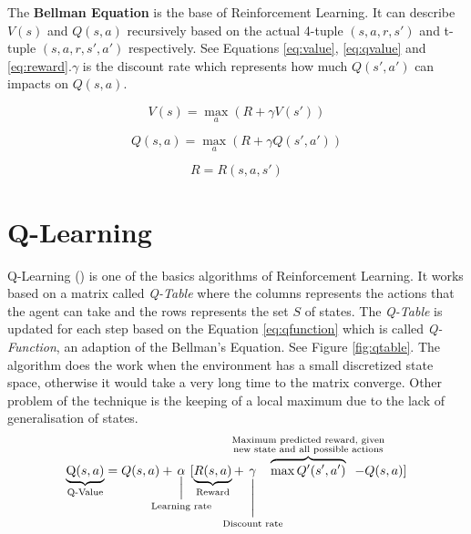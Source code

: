\begin{defn}The \textbf{Bellman Equation} is the base of Reinforcement Learning. It can describe $V(s)$ and $Q(s,a)$ recursively based on the actual 4-tuple $(s, a, r, s')$ and t-tuple $(s, a, r, s', a')$ respectively. See Equations \ref{eq:value}, \ref{eq:qvalue} and \ref{eq:reward}.$\gamma$ is the discount rate which represents how much $Q(s', a')$ can impacts on $Q(s,a)$.

\begin{equation}
    V(s) = \max_a(R + \gamma V(s'))
    \label{eq:value}
\end{equation}

\begin{equation}
    Q(s,a) = \max_a(R + \gamma Q(s', a'))
    \label{eq:qvalue}
\end{equation}

\begin{equation}
    R = R(s, a, s')
    \label{eq:reward}
\end{equation}

 \end{defn}

\section{Q-Learning}\label{section:qlearning}
Q-Learning (\cite{qlearning}) is one of the basics algorithms of Reinforcement Learning. It works based on a matrix called \textit{Q-Table} where the columns represents the actions that the agent can take and the rows represents the set $S$ of states. The \textit{Q-Table} is updated for each step based on the Equation \ref{eq:qfunction} which is called \textit{Q-Function}, an adaption of the Bellman's Equation. See Figure \ref{fig:qtable}. The algorithm does the work when the environment has a small discretized state space, otherwise it would take a very long time to the matrix converge. Other problem of the technique is the keeping of a local maximum due to the lack of generalisation of states.
\begin{equation}
\underbrace{\text Q(s,a)}_{\scriptstyle\text{Q-Value}}=Q(s,a)+\mkern-34mu\underset{\text{Learning rate}}{\underset{\Bigl|}{\alpha}}\mkern-30mu[\underbrace{R(s,a)}_{\scriptstyle\text{Reward}}+\mkern-30mu\underset{\text{Discount rate}}{\underset{\Biggl|}{\gamma}}\mkern-75mu\overbrace{\max Q'(s',a')}^{\scriptstyle\substack{\text{Maximum predicted reward, given} \\ \text{new state and all possible actions}}}\mkern-45mu-Q(s,a)]
\label{eq:qfunction}
\end{equation}

